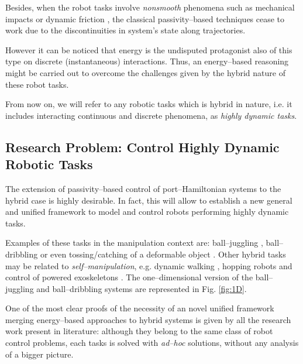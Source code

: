 %
Besides, when the robot tasks involve \textit{nonsmooth} phenomena such as mechanical impacts or dynamic friction \citep{brogliato1999nonsmooth}, the classical passivity--based techniques cease to work due to the discontinuities in system's state along trajectories. 

However it can be noticed that energy is the undisputed protagonist also of this type on discrete (instantaneous) interactions. Thus, an energy--based reasoning might be carried out to overcome the challenges given by the hybrid nature of these robot tasks.  

From now on, we will refer to any robotic tasks which is hybrid in nature, i.e. it includes interacting continuous and discrete phenomena, as \textit{highly dynamic tasks}.
\subsection{Research Problem: Control Highly Dynamic Robotic Tasks}
%
The extension of passivity--based control of port--Hamiltonian systems to the hybrid case is highly desirable. In fact, this will allow to establish a new general and unified framework to model and control robots performing highly dynamic tasks.
%
\newline

%
Examples of these tasks in the manipulation context are:
ball--juggling \citep{sanfelice2007hybrid, tian2013}, ball--dribbling \citep{Batz2010, haddadin2018exploiting} or even tossing/catching of a deformable object \citep{ruggero2018}. 
Other hybrid tasks may be related to \textit{self--manipulation}, e.g. dynamic walking \citep{spong2007,westervelt2018feedback}, hopping robots \citep{Ishikawa2003} and control of powered exoskeletons \citep{harib2018feedback,lv2018design}. The one--dimensional version of the ball--juggling and ball--dribbling systems are represented in Fig. \ref{fig:1D}.
%
\newline

%
One of the most clear proofs of the necessity of an novel unified framework merging energy--based approaches to hybrid systems is given by all the research work present in literature: although they belong to the same class of robot control problems, each tasks is solved with \textit{ad--hoc} solutions, without any analysis of a bigger picture.  
%
\newline

